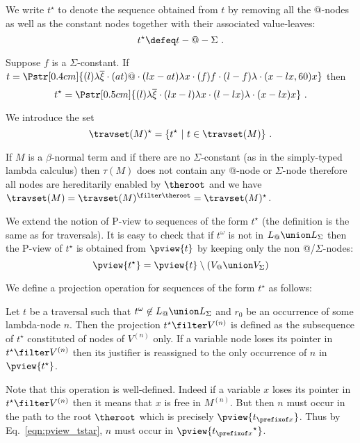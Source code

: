 We write $t^\star$ to denote the sequence obtained from $t$ by
removing all the @-nodes as well as the constant nodes together with
their associated value-leaves:
$$ t^\star \defeq t -@ - \Sigma \ .$$
\begin{example} Suppose $f$ is a $\Sigma$-constant.
If $t = \Pstr[0.4cm]{ (l){\lambda \overline{\xi}} \cdot (at)@ \cdot
(lx-at){\lambda x}\cdot (f)f \cdot (l-f){\lambda} \cdot (x-lx,60)x}$
then
$$t^\star = \Pstr[0.5cm]{ (l){\lambda \overline{\xi}}
 \cdot (lx-l){\lambda x}\cdot (l-lx){\lambda} \cdot (x-lx)x} \ .$$
\end{example}

We introduce the set
$$\travset(M)^\star = \{ t^\star \ | \  t \in \travset(M) \} \ .$$

\begin{remark}
If $M$ is a $\beta$-normal term and if there are no
$\Sigma$-constant (as in the simply-typed lambda calculus) then
$\tau(M)$ does not contain any @-node or $\Sigma$-node therefore all
nodes are hereditarily enabled by $\theroot$ and we have $\travset(M) =
\travset(M)^{\filter \theroot} = \travset(M)^\star$.
\end{remark}


We extend the notion of P-view to sequences of the form $t^\star$
(the definition is the same as for traversals). It is easy to check
that if $t^\omega$ is not in $L_@ \union L_\Sigma$ then the P-view
of $t^\star$ is obtained from $\pview{t}$ by keeping only the non
@/$\Sigma$-nodes:
\begin{equation}
 \pview{t^\star} = \pview{t} \setminus (V_@ \union V_\Sigma) \label{eqn:pview_tstar}
\end{equation}

We define a projection operation for sequences of the form $t^\star$
as follows:
\begin{definition}
\label{def:subterm_trav_projection}
  Let $t$ be a traversal such that $t^\omega\not\in L_@ \union L_\Sigma$ and $r_0$ be an occurrence of some
lambda-node $n$. Then the projection $t^\star \filter V^{(n)}$ is
defined as the subsequence of $t^\star$ constituted of nodes of
$V^{(n)}$ only. If a variable node loses its pointer in $t^\star
\filter V^{(n)}$ then its justifier is reassigned to the only
occurrence of $n$ in $\pview{t^\star}$.
\end{definition}
Note that this operation is well-defined. Indeed if a variable $x$
loses its pointer in $t^\star \filter V^{(n)}$ then it means that
$x$ is free in $M^{(n)}$. But then $n$ must occur in the path to
the root $\theroot$ which is precisely $\pview{t_{\prefixof x}}$.
Thus by Eq.\ \ref{eqn:pview_tstar}, $n$ must occur in
$\pview{{t_{\prefixof x}}^\star}$.



